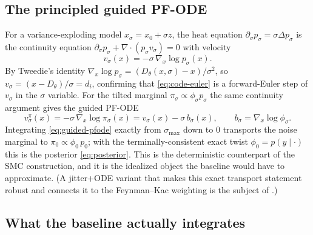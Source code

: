 \documentclass[11pt]{article}
\begin{document}
\subsection{The principled guided PF-ODE}

For a variance-exploding model $x_\sigma=x_0+\sigma z$, the heat equation
$\partial_\sigma p_\sigma=\sigma\Delta p_\sigma$ is the continuity equation
$\partial_\sigma p_\sigma+\nabla\!\cdot\!(p_\sigma v_\sigma)=0$ with velocity
\begin{equation}\label{eq:pfode}
  v_\sigma(x) = -\sigma\,\nabla_x\log p_\sigma(x).
\end{equation}
By Tweedie's identity $\nabla_x\log p_\sigma=(D_\theta(x,\sigma)-x)/\sigma^2$, so
$v_\sigma=(x-D_\theta)/\sigma=d_i$, confirming that \eqref{eq:code-euler} is a forward-Euler step of
$v_\sigma$ in the $\sigma$ variable. For the tilted marginal $\pi_\sigma\propto\phi_\sigma p_\sigma$
the same continuity argument gives the guided PF-ODE
\begin{equation}\label{eq:guided-pfode}
  v^\pi_\sigma(x) = -\sigma\,\nabla_x\log\pi_\sigma(x)
  = v_\sigma(x) - \sigma\,b_\sigma(x),
  \qquad b_\sigma=\nabla_x\log\phi_\sigma .
\end{equation}
Integrating \eqref{eq:guided-pfode} exactly from $\sigma_{\max}$ down to $0$ transports the noise
marginal to $\pi_0\propto\phi_0\,p_0$; with the terminally-consistent exact twist
$\phi_0=p(y\mid\cdot)$ this is the posterior \eqref{eq:posterior}. This is the deterministic
counterpart of the SMC construction, and it is the idealized object the baseline would have to
approximate. (A jitter+ODE variant that makes this exact transport statement robust and connects it
to the Feynman--Kac weighting is the subject of \citealp{note3}.)

\subsection{What the baseline actually integrates}
\end{document}
